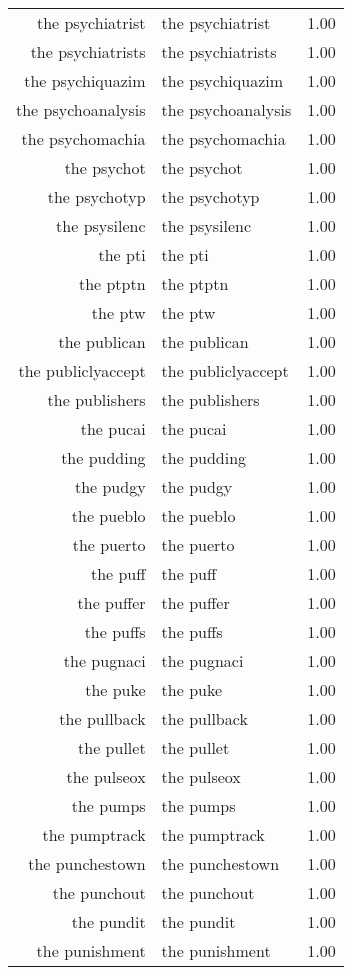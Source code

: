 \begin{table}[ht]
\begin{tabular}{rlr}
  the psychiatrist & the psychiatrist & 1.00 \\ 
  the psychiatrists & the psychiatrists & 1.00 \\ 
  the psychiquazim & the psychiquazim & 1.00 \\ 
  the psychoanalysis & the psychoanalysis & 1.00 \\ 
  the psychomachia & the psychomachia & 1.00 \\ 
  the psychot & the psychot & 1.00 \\ 
  the psychotyp & the psychotyp & 1.00 \\ 
  the psysilenc & the psysilenc & 1.00 \\ 
  the pti & the pti & 1.00 \\ 
  the ptptn & the ptptn & 1.00 \\ 
  the ptw & the ptw & 1.00 \\ 
  the publican & the publican & 1.00 \\ 
  the publiclyaccept & the publiclyaccept & 1.00 \\ 
  the publishers & the publishers & 1.00 \\ 
  the pucai & the pucai & 1.00 \\ 
  the pudding & the pudding & 1.00 \\ 
  the pudgy & the pudgy & 1.00 \\ 
  the pueblo & the pueblo & 1.00 \\ 
  the puerto & the puerto & 1.00 \\ 
  the puff & the puff & 1.00 \\ 
  the puffer & the puffer & 1.00 \\ 
  the puffs & the puffs & 1.00 \\ 
  the pugnaci & the pugnaci & 1.00 \\ 
  the puke & the puke & 1.00 \\ 
  the pullback & the pullback & 1.00 \\ 
  the pullet & the pullet & 1.00 \\ 
  the pulseox & the pulseox & 1.00 \\ 
  the pumps & the pumps & 1.00 \\ 
  the pumptrack & the pumptrack & 1.00 \\ 
  the punchestown & the punchestown & 1.00 \\ 
  the punchout & the punchout & 1.00 \\ 
  the pundit & the pundit & 1.00 \\ 
  the punishment & the punishment & 1.00 \\ 

\end{tabular}
\end{table}
